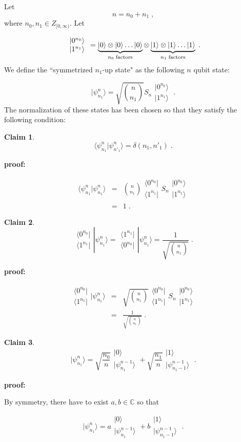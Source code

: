\documentclass[12pt]{article}%
\newtheorem{claim}{Claim}
\newcommand{\proof}[0]{{\bf proof:} }
\newcommand{\qed}[0]{\newline\noindent{\bf QED }}
\newcommand{\bra}[1]{\langle#1|}
\newcommand{\ket}[1]{|#1\rangle}
\newcommand{\av}[1]{\langle#1\rangle}
\newcommand{\beq}{\begin{equation}}
\newcommand{\eeq}{\end{equation}}
\newcommand{\beqa}{\begin{eqnarray}}
\newcommand{\eeqa}{\end{eqnarray}}
\newcommand{\CC}[0]{{ \mathbb{C}} }
\newcommand{\brazo}{ \begin{array}{r}
 \bra{0^{n_0}}
 \\
 \bra{1^{n_1}}
 \end{array}
 }
\newcommand{\ketzo}{ \begin{array}{l}
 \ket{0^{n_0}}
 \\
 \ket{1^{n_1}}
 \end{array}
 }
\begin{document}
{Let
 \beq
 n = n_0 + n_1
 \;,
 \eeq
 where $n_0, n_1\in Z_{[0, \infty)}$.
Let

 \beq
 \ketzo = \underbrace{
 \ket{0}\otimes\ket{0}\ldots\ket{0}}
 _{n_0\; {\rm factors}}
 \otimes
 \underbrace{
 \ket{1}\otimes\ket{1}\ldots\ket{1}}
 _{n_1\; {\rm factors}}
 \;.
 \eeq
 We define  the ``symmetrized
 $n_1$-up state" as the following $n$ qubit state:



 \beq
 \ket{\psi^{n}_{n_1}} =
 \sqrt{n\choose n_1}S_n
\ketzo
 \;.
 \eeq
 The normalization of these states has
 been chosen so that they satisfy
 the following condition:

 \begin{claim}
 \beq
 \av{\psi^{n}_{n_1} | \psi^{n}_{n'_1}}
 = \delta(n_1, n'_1)
 \;.
 \eeq
 \end{claim}
 \proof


 \beqa
 \av{\psi^{n}_{n_1} | \psi^{n}_{n_1}}
 &=&
{n\choose n_1}
\brazo
S_n
\ketzo
 \\
 &=& 1
 \;.
 \eeqa
 \qed


 \begin{claim}
 \beq
 \brazo \ket{\psi^n_{n_1}}=
 \begin{array}{c}
  \bra{1^{n_1}}
 \\
 \bra{0^{n_0}}
 \end{array}
 \ket{\psi^n_{n_1}} =
 \frac{1}{\sqrt{n\choose n_1}}
 \;.
 \eeq
 \end{claim}
 \proof

 \beqa
 \brazo \ket{\psi^n_{n_1}} &=&
 \sqrt{n\choose n_1}
 \brazo S_n \ketzo
 \\
 &=&
  \frac{1}{\sqrt{n\choose n_1}}
 \;.
 \eeqa
 \qed

 \begin{claim}

 \beq
 \ket{\psi^n_{n_1}}=
 \sqrt{\frac{n_0}{n}}
 \begin{array}{l}
 \ket{0}
 \\
 \ket{\psi^{n-1}_{n_1}}
 \end{array}
 +
 \sqrt{\frac{n_1}{n}}
 \begin{array}{l}
 \ket{1}
 \\
 \ket{\psi^{n-1}_{n_1-1}}
 \end{array}
 \;.
 \label{eq-top-qubit-resolved}
 \eeq
 \end{claim}
 \proof

 By symmetry, there
 have to exist $a,b \in \CC$
 so that

 \beq
 \ket{\psi^n_{n_1}}=
 a
 \begin{array}{l}
 \ket{0}
 \\
 \ket{\psi^{n-1}_{n_1}}
 \end{array}
 +
 b
 \begin{array}{l}
 \ket{1}
 \\
 \ket{\psi^{n-1}_{n_1-1}}
 \end{array}
 \;.
 \eeq

}
\end{document}
